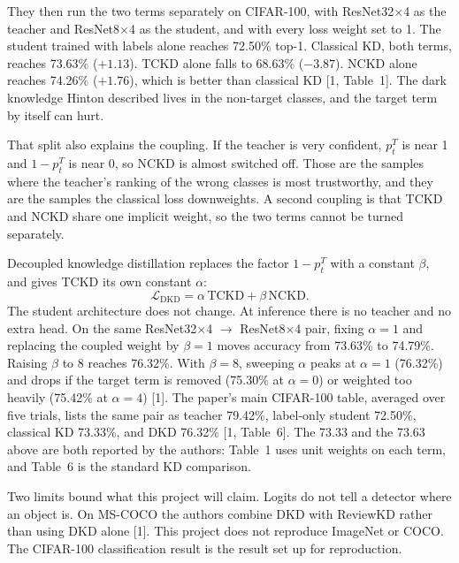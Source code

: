 \documentclass[11pt]{article}
\begin{document}
They then run the two terms separately on CIFAR-100, with ResNet32\(\times\)4 as the teacher and ResNet8\(\times\)4 as the student, and with every loss weight set to 1. The student trained with labels alone reaches 72.50\% top-1. Classical KD, both terms, reaches 73.63\% (\(+1.13\)). TCKD alone falls to 68.63\% (\(-3.87\)). NCKD alone reaches 74.26\% (\(+1.76\)), which is better than classical KD [1, Table~1]. The dark knowledge Hinton described lives in the non-target classes, and the target term by itself can hurt.

That split also explains the coupling. If the teacher is very confident, \(p^{T}_{t}\) is near 1 and \(1 - p^{T}_{t}\) is near 0, so NCKD is almost switched off. Those are the samples where the teacher's ranking of the wrong classes is most trustworthy, and they are the samples the classical loss downweights. A second coupling is that TCKD and NCKD share one implicit weight, so the two terms cannot be turned separately.

Decoupled knowledge distillation replaces the factor \(1 - p^{T}_{t}\) with a constant \(\beta\), and gives TCKD its own constant \(\alpha\):
\begin{equation}
\mathcal{L}_{\mathrm{DKD}} = \alpha\,\mathrm{TCKD} + \beta\,\mathrm{NCKD}.
\label{eq:dkd}
\end{equation}
The student architecture does not change. At inference there is no teacher and no extra head. On the same ResNet32\(\times\)4 \(\rightarrow\) ResNet8\(\times\)4 pair, fixing \(\alpha = 1\) and replacing the coupled weight by \(\beta = 1\) moves accuracy from 73.63\% to 74.79\%. Raising \(\beta\) to 8 reaches 76.32\%. With \(\beta = 8\), sweeping \(\alpha\) peaks at \(\alpha = 1\) (76.32\%) and drops if the target term is removed (75.30\% at \(\alpha = 0\)) or weighted too heavily (75.42\% at \(\alpha = 4\)) [1]. The paper's main CIFAR-100 table, averaged over five trials, lists the same pair as teacher 79.42\%, label-only student 72.50\%, classical KD 73.33\%, and DKD 76.32\% [1, Table~6]. The 73.33 and the 73.63 above are both reported by the authors: Table~1 uses unit weights on each term, and Table~6 is the standard KD comparison.

Two limits bound what this project will claim. Logits do not tell a detector where an object is. On MS-COCO the authors combine DKD with ReviewKD rather than using DKD alone [1]. This project does not reproduce ImageNet or COCO. The CIFAR-100 classification result is the result set up for reproduction.
\end{document}
